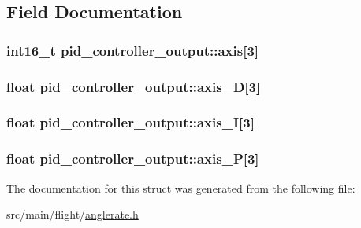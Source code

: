\subsection{Field Documentation}
\hypertarget{structpid__controller__output_a88edf80b3efde787747b459dde00e418}{
\subsubsection[{axis}]{\setlength{\rightskip}{0pt plus 5cm}int16\+\_\+t pid\+\_\+controller\+\_\+output\+::axis\mbox{[}3\mbox{]}}}\label{structpid__controller__output_a88edf80b3efde787747b459dde00e418}
\hypertarget{structpid__controller__output_ae6bf945884869babff5eb66b97bbca57}{
\subsubsection[{axis\+\_\+\+D}]{\setlength{\rightskip}{0pt plus 5cm}float pid\+\_\+controller\+\_\+output\+::axis\+\_\+\+D\mbox{[}3\mbox{]}}}\label{structpid__controller__output_ae6bf945884869babff5eb66b97bbca57}
\hypertarget{structpid__controller__output_af26171b3d6c8f997470850480f365b3c}{
\subsubsection[{axis\+\_\+\+I}]{\setlength{\rightskip}{0pt plus 5cm}float pid\+\_\+controller\+\_\+output\+::axis\+\_\+\+I\mbox{[}3\mbox{]}}}\label{structpid__controller__output_af26171b3d6c8f997470850480f365b3c}
\hypertarget{structpid__controller__output_a18a80534b5688a9ece1e96116b66c631}{
\subsubsection[{axis\+\_\+\+P}]{\setlength{\rightskip}{0pt plus 5cm}float pid\+\_\+controller\+\_\+output\+::axis\+\_\+\+P\mbox{[}3\mbox{]}}}\label{structpid__controller__output_a18a80534b5688a9ece1e96116b66c631}


The documentation for this struct was generated from the following file\+:\begin{DoxyCompactItemize}
\item 
src/main/flight/\hyperlink{flight_2anglerate_8h}{anglerate.\+h}\end{DoxyCompactItemize}
